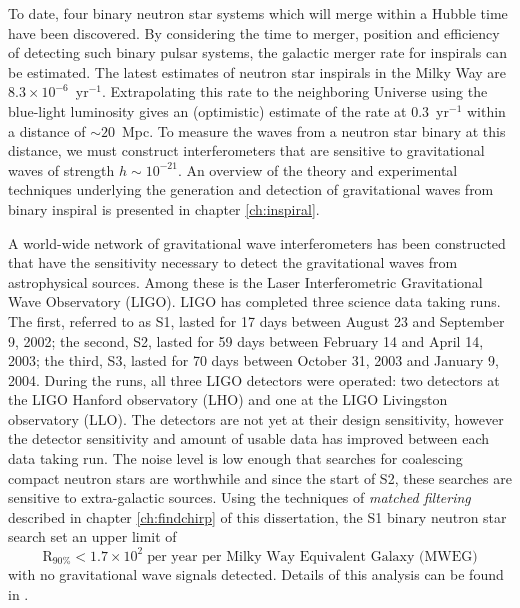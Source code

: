 To date, four binary neutron star systems which will merge within a Hubble time
have been discovered.   By considering the time to merger, position and
efficiency of detecting such binary pulsar systems, the galactic merger rate
for inspirals can be estimated\cite{Phinney:1991ei}.  The latest estimates of
neutron star inspirals in the Milky Way are $8.3 \times 10^{-6}$~yr$^{-1}$. 
Extrapolating this rate to the neighboring Universe using the
blue-light luminosity gives an (optimistic) estimate of the rate at
$0.3$~yr$^{-1}$ within a distance of $\sim 20$~Mpc.  To measure the waves from
a neutron star binary at this distance,  we must construct
interferometers that are sensitive to gravitational waves of strength $h \sim
10^{-21}$. An overview of the theory and experimental techniques underlying
the generation and detection of gravitational waves from binary inspiral is
presented in chapter \ref{ch:inspiral}.

A world-wide network of gravitational wave interferometers has been
constructed that have the sensitivity necessary to detect the gravitational
waves from astrophysical sources. Among these is the Laser Interferometric
Gravitational Wave Observatory (LIGO)\cite{Barish:1999}. LIGO has completed
three science data taking runs. The first, referred to as S1, lasted for 17
days between August 23 and September 9, 2002; the second, S2, lasted for 59
days between February 14 and April 14, 2003; the third, S3, lasted for 70 days
between October 31, 2003 and January 9, 2004.  During the runs, all three LIGO
detectors were operated: two detectors at the LIGO Hanford observatory (LHO)
and one at the LIGO Livingston observatory (LLO).  The detectors are not yet
at their design sensitivity, however the detector sensitivity and amount of
usable data has improved between each data taking run. The noise level is low
enough that searches for coalescing compact neutron stars are worthwhile and
since the start of S2, these searches are sensitive to extra-galactic sources.
Using the techniques of \emph{matched filtering} described in chapter
\ref{ch:findchirp} of this dissertation, the S1 binary neutron star search set
an upper limit of
\begin{equation}
\mathrm{R}_{90\%} < 1.7 \times 10^2 \;\textrm{per year per Milky Way Equivalent Galaxy (MWEG)}
\end{equation}
with no gravitational wave signals detected. Details of this analysis can be
found in \cite{LIGOS1iul}. 

